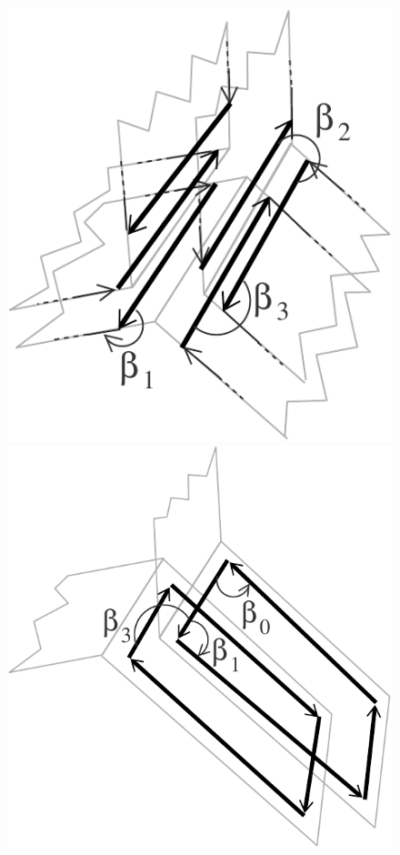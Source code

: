 \begin{figure}
  \begin{ccTexOnly}
    \begin{center}
      \includegraphics[width=\LargFig]{Combinatorial_map/fig/pdf/intuitif-example-zoom}
      \includegraphics[width=\LargFig]{Combinatorial_map/fig/pdf/intuitif-example-zoom2}

\end{center}
\end{ccTexOnly}
\end{figure}
